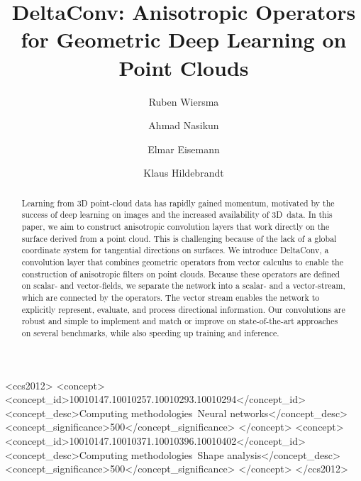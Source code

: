 \documentclass[acmtog, authorversion]{acmart}
\begin{document}
\title{DeltaConv: Anisotropic Operators for Geometric Deep Learning on Point Clouds}

\author{Ruben Wiersma}
\author{Ahmad Nasikun}
\author{Elmar Eisemann}
\author{Klaus Hildebrandt}
 
\renewcommand\shortauthors{R. Wiersma, A. Nasikun, E. Eisemann, \& K. Hildebrandt}

\begin{abstract}
Learning from 3D point-cloud data has rapidly gained momentum, motivated by the success of deep learning on images and the increased availability of 3D~data. In this paper, we aim to construct anisotropic convolution layers that work directly on the surface derived from a point cloud. This is challenging because of the lack of a global coordinate system for tangential directions on surfaces. We introduce DeltaConv, a convolution layer that combines geometric operators from vector calculus to enable the construction of anisotropic filters on point clouds. Because these operators are defined on scalar- and vector-fields, we separate the network into a scalar- and a vector-stream, which are connected by the operators. The vector stream enables the network to explicitly represent, evaluate, and process directional information. Our convolutions are robust and simple to implement and match or improve on state-of-the-art approaches on several benchmarks, while also speeding up training and inference.
\end{abstract}

\begin{CCSXML}
<ccs2012>
<concept>
<concept_id>10010147.10010257.10010293.10010294</concept_id>
<concept_desc>Computing methodologies~Neural networks</concept_desc>
<concept_significance>500</concept_significance>
</concept>
<concept>
<concept_id>10010147.10010371.10010396.10010402</concept_id>
<concept_desc>Computing methodologies~Shape analysis</concept_desc>
<concept_significance>500</concept_significance>
</concept>
</ccs2012>
\end{CCSXML}
\end{document}
